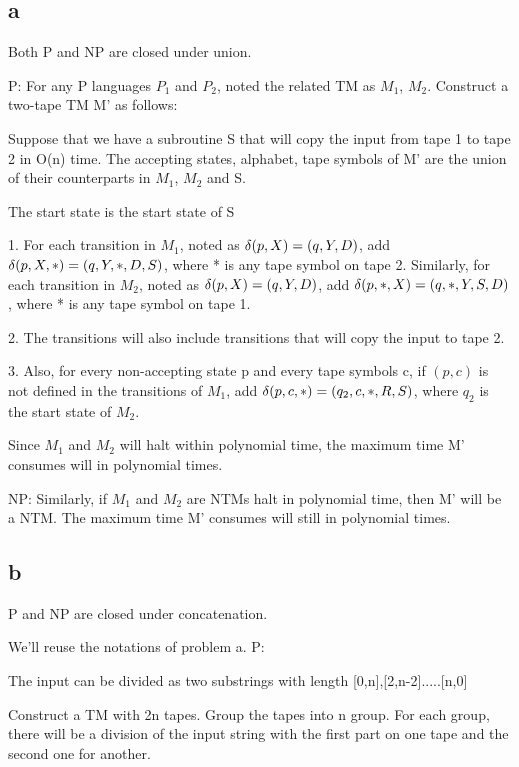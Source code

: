 \documentclass[a4paper,UTF8]{ctexart}
\theoremstyle{definition}
\begin{document}
\subsection*{a}
Both P and NP are closed under union.

P: For any P languages $P_1$ and $P_2$, noted the related TM as $M_1$, $M_2$. Construct 
a two-tape TM M' as follows:

Suppose that we have a subroutine S that will copy the input from tape 1 to tape 2 in O(n) time.
The accepting states, alphabet, tape symbols of M' are the union of
 their counterparts in $M_1$, $M_2$ and S.


The start state is the start state of S

1. For each transition in $M_1$, noted as $\delta(p,X)=(q,Y,D)$,
 add $\delta(p,X,*)=(q,Y,*,D,S)$, where * is any tape symbol on tape 2.
Similarly, for each transition in $M_2$, noted as $\delta(p,X)=(q,Y,D)$,
 add $\delta(p,*, X)=(q,*,Y,S, D)$, where * is any tape symbol on tape 1.

2. The transitions will also include transitions that will copy the input to tape 2.

3. Also, for every  
non-accepting state p and every tape symbols c, if $(p,c)$ is not defined in the 
transitions of $M_1$, add $\delta(p,c,*)=(q_2,c,*,R,S)$, where $q_2$ is the start state of $M_2$.

Since $M_1$ and $M_2$ will halt within polynomial time, the maximum time M' consumes will in 
polynomial times.

NP: Similarly, if $M_1$ and $M_2$ are NTMs halt in polynomial time,
 then M' will be a NTM. The maximum time M' consumes will still in 
polynomial times.

\subsection*{b}
P and NP are closed under concatenation. 

We'll reuse the notations of problem a.
P: 

The input can be divided as two substrings with length [0,n],[2,n-2].....[n,0]

Construct a TM with 2n tapes. Group the tapes into n group.
For each group, there will be a division of the input string with the 
first part on one tape and the second one for another.
\end{document}
